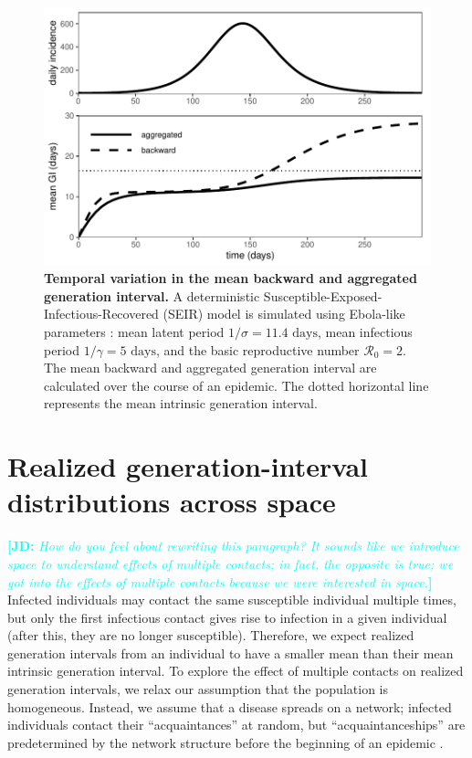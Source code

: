 \documentclass[12pt]{article}
\newcommand{\RR}{\ensuremath{{\mathcal R}}}
\newcommand{\comment}[3]{\textcolor{#1}{\textbf{[#2: }\textsl{#3}\textbf{]}}}
\newcommand{\jd}[1]{\comment{cyan}{JD}{#1}}
\begin{document}
\begin{figure}[!ht]
\includegraphics[width=\textwidth]{../fig/temporal_effect.pdf}
\caption{\textbf{Temporal variation in the mean backward and aggregated generation interval.}
A deterministic Susceptible-Exposed-Infectious-Recovered (SEIR) model is simulated using Ebola-like parameters \citep{who2014ebola}: mean latent period $1/\sigma = 11.4 \textrm{ days}$, mean infectious period $1/\gamma = 5 \textrm{ days}$, and the basic reproductive number $\RR_0 = 2$. 
The mean backward and aggregated generation interval are calculated over the course of an epidemic.
The dotted horizontal line represents the mean intrinsic generation interval.
}
\label{fig:censor}
\end{figure}

\section{Realized generation-interval distributions across space}

\jd{How do you feel about rewriting this paragraph? It sounds like we introduce space to understand effects of multiple contacts; in fact, the opposite is true; we got into the effects of multiple contacts because we were interested in space.}
Infected individuals may contact the same susceptible individual multiple times, but only the first infectious contact gives rise to infection in a given individual (after this, they are no longer susceptible).
Therefore, we expect realized generation intervals from an individual to have a smaller mean than their mean intrinsic generation interval.
To explore the effect of multiple contacts on realized generation intervals, we relax our assumption that the population is homogeneous.
Instead, we assume that a disease spreads on a network;
infected individuals contact their ``acquaintances'' at random, but ``acquaintanceships'' are predetermined by the network structure before the beginning of an epidemic \cite{trapman2016inferring}.
\end{document}
